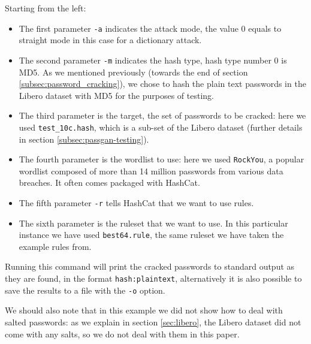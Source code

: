 Starting from the left:
\begin{itemize}
\item The first parameter \texttt{-a} indicates the attack mode, the value 0 equals to straight mode in this case for a dictionary attack.

\item The second parameter \texttt{-m} indicates the hash type, hash type number 0 is MD5. As we mentioned previously (towards the end of section \ref{subsec:password_cracking}), we chose to hash the plain text passwords in the Libero dataset with MD5 for the purposes of testing.

\item The third parameter is the target, the set of passwords to be cracked: here we used \texttt{test\_10c.hash}, which is a sub-set of the Libero dataset (further details in section \ref{subsec:passgan-testing}).

\item The fourth parameter is the wordlist to use: here we used \texttt{RockYou}, a popular wordlist composed of more than 14 million passwords from various data breaches. It often comes packaged with HashCat.

\item The fifth parameter \texttt{-r} tells HashCat that we want to use rules.

\item The sixth parameter is the ruleset that we want to use. In this particular instance we have used \texttt{best64.rule}, the same ruleset we have taken the example rules from.    
\end{itemize}

Running this command will print the cracked passwords to standard output as they are found, in the format \texttt{hash:plaintext}, alternatively it is also possible to save the results to a file with the \texttt{-o} option.

We should also note that in this example we did not show how to deal with salted passwords: as we explain in section \ref{sec:libero}, the Libero dataset did not come with any salts, so we do not deal with them in this paper.

